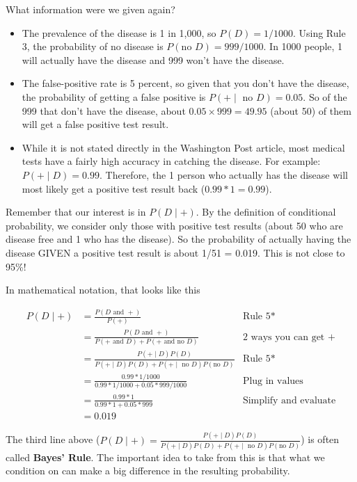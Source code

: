 \documentclass[
]{book}
\begin{document}
What information were we given again?

\begin{itemize}
\item
  The prevalence of the disease is 1 in 1,000, so \(P(D) = 1/1000\). Using Rule 3, the probability of no disease is \(P(\text{no }D) = 999/1000\). In 1000 people, 1 will actually have the disease and 999 won't have the disease.
\item
  The false-positive rate is 5 percent, so given that you don't have the disease, the probability of getting a false positive is \(P(+ \mid\text{ no } D) = 0.05\). So of the 999 that don't have the disease, about \(0.05\times 999 = 49.95\) (about 50) of them will get a false positive test result.
\item
  While it is not stated directly in the Washington Post article, most medical tests have a fairly high accuracy in catching the disease. For example: \(P(+ \mid D) = 0.99\). Therefore, the 1 person who actually has the disease will most likely get a positive test result back (\(0.99*1 = 0.99\)).
\end{itemize}

Remember that our interest is in \(P(D \mid +)\). By the definition of conditional probability, we consider only those with positive test results (about 50 who are disease free and 1 who has the disease). So the probability of actually having the disease GIVEN a positive test result is about 1/51 = 0.019. This is not close to 95\%!

In mathematical notation, that looks like this

\begin{align*}
P(D \mid +) &= \frac{P(D \text{ and } +)}{P(+)} &\text{Rule 5*}\\
&= \frac{P(D \text{ and } +)}{P(+ \text{ and } D) + P(+ \text{ and no } D)} &\text{2 ways you can get +}\\
&= \frac{P(+ \mid D) P(D)}{P( + \mid D) P(D) + P( + \mid \text{ no }D) P(\text{no }D)} &\text{Rule 5*}\\
&= \frac{0.99*1/1000}{0.99*1/1000 + 0.05*999/1000} &\text{Plug in values}\\
&= \frac{0.99*1}{0.99*1 + 0.05*999} &\text{Simplify and evaluate}\\
&= 0.019
\end{align*}

The third line above (\(P(D \mid +) = \frac{P(+ \mid D) P(D)}{P( + \mid D) P(D) + P( + \mid \text{ no }D) P(\text{no }D)}\)) is often called \textbf{Bayes' Rule}. The important idea to take from this is that what we condition on can make a big difference in the resulting probability.
\end{document}
